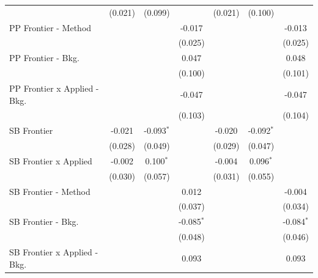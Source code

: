 \begin{tabular}{lcccccc}
                                  & (0.021)        & (0.099)       &                & (0.021)        & (0.100)       &   \\   
   PP Frontier - Method           &                &               & -0.017         &                &               & -0.013\\   
                                  &                &               & (0.025)        &                &               & (0.025)\\   
   PP Frontier - Bkg.             &                &               & 0.047          &                &               & 0.048\\   
                                  &                &               & (0.100)        &                &               & (0.101)\\   
   PP Frontier x Applied - Bkg.   &                &               & -0.047         &                &               & -0.047\\   
                                  &                &               & (0.103)        &                &               & (0.104)\\   
   SB Frontier                    & -0.021         & -0.093$^{*}$  &                & -0.020         & -0.092$^{*}$  &   \\   
                                  & (0.028)        & (0.049)       &                & (0.029)        & (0.047)       &   \\   
   SB Frontier x Applied          & -0.002         & 0.100$^{*}$   &                & -0.004         & 0.096$^{*}$   &   \\   
                                  & (0.030)        & (0.057)       &                & (0.031)        & (0.055)       &   \\   
   SB Frontier - Method           &                &               & 0.012          &                &               & -0.004\\   
                                  &                &               & (0.037)        &                &               & (0.034)\\   
   SB Frontier - Bkg.             &                &               & -0.085$^{*}$   &                &               & -0.084$^{*}$\\   
                                  &                &               & (0.048)        &                &               & (0.046)\\   
   SB Frontier x Applied - Bkg.   &                &               & 0.093          &                &               & 0.093\\   

\end{tabular}
